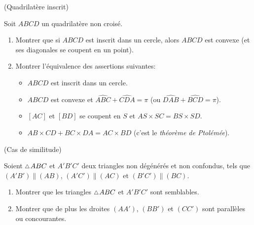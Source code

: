 \documentclass[a4paper,11pt,reqno]{amsart}
\begin{document}
\begin{exo} (Quadrilatère inscrit)

    Soit $ABCD$ un quadrilatère non croisé.
    \begin{enumerate}
      \item Montrer que si $ABCD$ est inscrit dans un cercle, alors $ABCD$ est convexe (et ses diagonales se coupent en un point).
      \item Montrer l'équivalence des assertions suivantes:
      \begin{itemize}
        \item $ABCD$ est inscrit dans un cercle.
        \item $ABCD$ est convexe et $\widehat{ABC}+\widehat{CDA} = \pi$ (ou $\widehat{DAB}+\widehat{BCD} = \pi$).
        \item $[AC]$ et $[BD]$ se coupent en $S$ et $AS \times SC = BS \times SD$.
        \item $AB\times CD + BC\times DA = AC\times BD$ (c'est le \emph{théorème de Ptolémée}).
      \end{itemize}
    \end{enumerate}
\end{exo}

\begin{exo} (Cas de similitude)

  Soient $\tri ABC$ et $A'B'C'$ deux triangles non dégénérés et non confondus, tels que $(A'B') \parallel (AB)$, $(A'C') \parallel (AC)$ et $(B'C') \parallel (BC)$.
  \begin{enumerate}
    \item Montrer que les triangles $\tri ABC$ et $A'B'C'$ sont semblables.
    \item Montrer que de plus les droites $(AA')$, $(BB')$ et $(CC')$ sont parallèles ou concourantes.
  \end{enumerate}

\end{exo}
\end{document}
